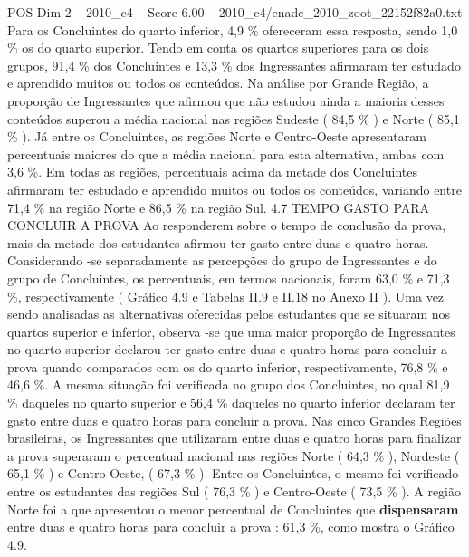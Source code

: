 \begin{textsample}{POS Dim 2 – 2010\_c4 – Score 6.00 – 2010\_c4/enade\_2010\_zoot\_22152f82a0.txt}
Para os Concluintes do quarto inferior, 4,9 \% ofereceram essa resposta, sendo 1,0 \% os do quarto superior.
Tendo em conta os quartos superiores para os dois grupos, 91,4 \% dos Concluintes e 13,3 \% dos Ingressantes afirmaram ter estudado e aprendido muitos ou todos os conteúdos.
Na análise por Grande Região, a proporção de Ingressantes que afirmou que não estudou ainda a maioria desses conteúdos superou a média nacional nas regiões Sudeste ( 84,5 \% ) e Norte ( 85,1 \% ).
Já entre os Concluintes, as regiões Norte e Centro-Oeste apresentaram percentuais maiores do que a média nacional para esta alternativa, ambas com 3,6 \%.
Em todas as regiões, percentuais acima da metade dos Concluintes afirmaram ter estudado e aprendido muitos ou todos os conteúdos, variando entre 71,4 \% na região Norte e 86,5 \% na região Sul. 4.7 TEMPO GASTO PARA CONCLUIR A PROVA Ao responderem sobre o tempo de conclusão da prova, mais da metade dos estudantes afirmou ter gasto entre duas e quatro horas.
Considerando -se separadamente as percepções do grupo de Ingressantes e do grupo de Concluintes, os percentuais, em termos nacionais, foram 63,0 \% e 71,3 \%, respectivamente ( Gráfico 4.9 e Tabelas II.9 e II.18 no Anexo II ).
Uma vez sendo analisadas as alternativas oferecidas pelos estudantes que se situaram nos quartos superior e inferior, observa -se que uma maior proporção de Ingressantes no quarto superior declarou ter gasto entre duas e quatro horas para concluir a prova quando comparados com os do quarto inferior, respectivamente, 76,8 \% e 46,6 \%.
A mesma situação foi verificada no grupo dos Concluintes, no qual 81,9 \% daqueles no quarto superior e 56,4 \% daqueles no quarto inferior declaram ter gasto entre duas e quatro horas para concluir a prova.
Nas cinco Grandes Regiões brasileiras, os Ingressantes que utilizaram entre duas e quatro horas para finalizar a prova superaram o percentual nacional nas regiões Norte ( 64,3 \% ), Nordeste ( 65,1 \% ) e Centro-Oeste, ( 67,3 \% ).
Entre os Concluintes, o mesmo foi verificado entre os estudantes das regiões Sul ( 76,3 \% ) e Centro-Oeste ( 73,5 \% ).
A região Norte foi a que apresentou o menor percentual de Concluintes que \textbf{dispensaram} entre duas e quatro horas para concluir a prova : 61,3 \%, como mostra o Gráfico 4.9.

\end{textsample}
